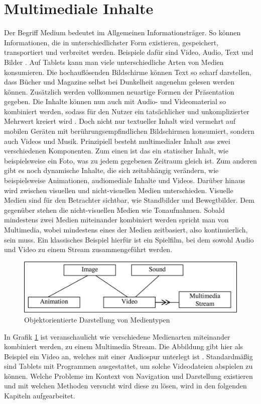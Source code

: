 \documentclass[11pt,a4paper]{report}
\begin{document}
\section{Multimediale Inhalte}

Der Begriff Medium bedeutet im Allgemeinen Informationsträger. So können Informationen, die in unterschiedlichster Form existieren, gespeichert, transportiert und verbreitet werden. Beispiele dafür sind Video, Audio, Text und Bilder \cite{steinmetz2013multimedia}. Auf Tablets kann man viele unterschiedliche Arten von Medien konsumieren. Die hochauflösenden Bildschirme können Text so scharf darstellen, dass Bücher und Magazine selbst bei Dunkelheit angenehm gelesen werden können. Zusätzlich werden vollkommen neuartige Formen der Präsentation gegeben. Die Inhalte können nun auch mit Audio- und Videomaterial so kombiniert werden, sodass für den Nutzer ein tatsächlicher und unkomplizierter Mehrwert kreiert wird \cite{kallinen2011effects}. Doch nicht nur textueller Inhalt wird vermehrt auf mobilen Geräten mit berührungsempfindlichen Bildschirmen konsumiert, sondern auch Videos und Musik. Prinzipiell besteht multimedialer Inhalt aus zwei verschiedenen Komponenten. Zum einen ist das ein statischer Inhalt, wie beispielsweise ein Foto, was zu jedem gegebenen Zeitraum gleich ist. Zum anderen gibt es noch dynamische Inhalte, die sich zeitabhängig verändern, wie beispielsweise Animationen, audiomediale Inhalte und Videos. Darüber hinaus wird zwischen visuellen und nicht-visuellen Medien unterschieden. Visuelle Medien sind für den Betrachter sichtbar, wie Standbilder und Bewegtbilder. Dem gegenüber stehen die nicht-visuellen Medien wie Tonaufnahmen. Sobald mindestens zwei Medien miteinander kombiniert werden spricht man von Multimedia, wobei mindestens eines der Medien zeitbasiert, also kontinuierlich, sein muss. Ein klassisches Beispiel hierfür ist ein Spielfilm, bei dem sowohl Audio und Video zu einem Stream zusammengeführt werden.
\begin{figure}[h]
\begin{center}
\includegraphics[scale=0.9]{./images/3.png}
\caption{Objektorientierte Darstellung von Medientypen \cite{reveiu2007using}}
\label{medien_objekt}
\end{center}
\end{figure}
In Grafik \ref{medien_objekt} ist veranschaulicht wie verschiedene Medienarten miteinander kombiniert werden, zu einem Multimedia Stream. Die Abbildung gibt hier als Beispiel ein Video an, welches mit einer Audiospur unterlegt ist \cite{reveiu2007using}. Standardmäßig sind Tablets mit Programmen ausgestattet, um solche Videodateien abspielen zu können. Welche Probleme im Kontext von Navigation und Darstellung existieren und mit welchen Methoden versucht wird diese zu lösen, wird in den folgenden Kapiteln aufgearbeitet.
\end{document}
